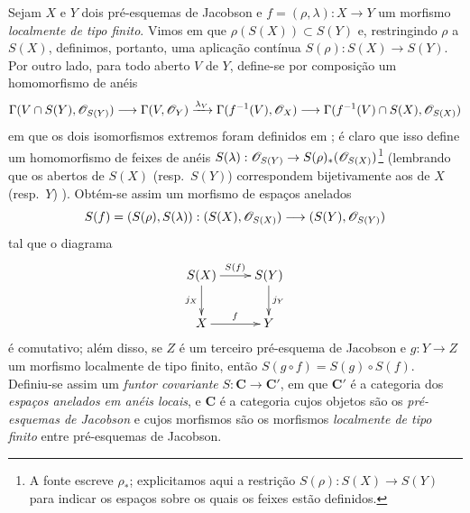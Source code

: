 \begin{env}[10.9.2]
\label{IV.10.9.2}
Sejam $X$ e $Y$ dois pré-esquemas de Jacobson e $f=(\rho,\lambda):X\to Y$ um morfismo \emph{localmente de tipo finito}.
Vimos em  que $\rho(S(X))\subset S(Y)$ e, restringindo $\rho$ a $S(X)$, definimos, portanto, uma aplicação contínua $S(\rho):S(X)\to S(Y)$.
Por outro lado, para todo aberto $V$ de $Y$, define-se por composição um homomorfismo de anéis
\[
  \Gamma(V\cap S(Y),\mathscr{O}_{S(Y)})\longrightarrow
  \Gamma(V,\mathscr{O}_Y)\xrightarrow{\lambda_V}
  \Gamma(f^{-1}(V),\mathscr{O}_X)\longrightarrow
  \Gamma(f^{-1}(V)\cap S(X),\mathscr{O}_{S(X)})
\]
em que os dois isomorfismos extremos foram definidos em ; é claro que isso define um homomorfismo de feixes de anéis $S(\lambda):\sh{O}_{S(Y)}\to S(\rho)_*(\sh{O}_{S(X)})$\footnote{A fonte escreve $\rho_*$; explicitamos aqui a restrição $S(\rho):S(X)\to S(Y)$ para indicar os espaços sobre os quais os feixes estão definidos.} (lembrando que os abertos de $S(X)$ (resp.\ $S(Y)$) correspondem bijetivamente aos de $X$ (resp.\ $Y$) ).
Obtém-se assim um morfismo de espaços anelados
\[
  S(f)=(S(\rho),S(\lambda)):(S(X),\mathscr{O}_{S(X)})\longrightarrow
  (S(Y),\mathscr{O}_{S(Y)})
\]
tal que o diagrama
\[
  \xymatrix{
    S(X)\ar[r]^{S(f)}\ar[d]_{j_X} & S(Y)\ar[d]^{j_Y}\\
    X\ar[r]^{f} & Y
  }
\]
é comutativo; além disso, se $Z$ é um terceiro pré-esquema de Jacobson e $g:Y\to Z$ um morfismo localmente de tipo finito, então $S(g\circ f)=S(g)\circ S(f)$.
Definiu-se assim um \emph{funtor covariante} $S:\mathbf{C}\to\mathbf{C}'$, em que $\mathbf{C}'$ é a categoria dos \emph{espaços anelados em anéis locais}, e $\mathbf{C}$ é a categoria cujos objetos são os \emph{pré-esquemas de Jacobson} e cujos morfismos são os morfismos \emph{localmente de tipo finito} entre pré-esquemas de Jacobson.
\end{env}

